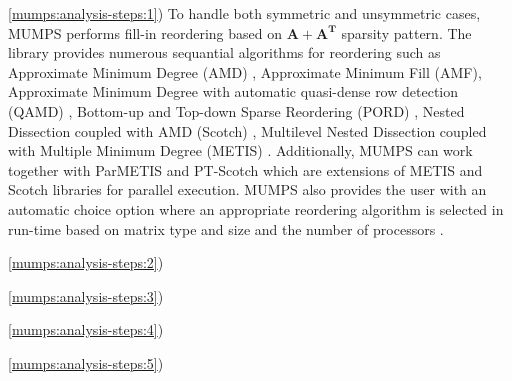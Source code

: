 \ref{mumps:analysis-steps:1}) To handle both symmetric and unsymmetric cases, MUMPS performs fill-in reordering based on $\boldsymbol{A} + \boldsymbol{A^T}$ sparsity pattern. The library provides numerous sequantial algorithms for reordering such as Approximate Minimum Degree (AMD) \cite{reordering:AMD}, Approximate Minimum Fill (AMF), Approximate Minimum Degree with automatic quasi-dense row detection (QAMD) \cite{reordering:QAMD}, Bottom-up and Top-down Sparse Reordering (PORD) \cite{reordering:PORD}, Nested Dissection coupled with AMD (Scotch) \cite{reordering:SCOTCH}, Multilevel Nested Dissection coupled with Multiple Minimum Degree (METIS) \cite{reordering:METIS}. Additionally, MUMPS can work together with ParMETIS and PT-Scotch which are extensions of METIS and Scotch libraries for parallel execution. MUMPS also provides the user with an automatic choice option where an appropriate reordering algorithm is selected in run-time based on matrix type and size and the number of processors \cite{mumps-manual}.


\ref{mumps:analysis-steps:2})

\ref{mumps:analysis-steps:3})

\ref{mumps:analysis-steps:4})


\ref{mumps:analysis-steps:5})












